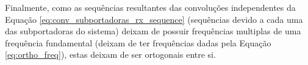 Finalmente, como as sequências resultantes das convoluções independentes da Equação \ref{eq:conv_subportadoras_rx_sequence} (sequências devido a cada uma das subportadoras do sistema) deixam de possuir frequências multiplas de uma frequência fundamental (deixam de ter frequências dadas pela Equação \ref{eq:ortho_freq}), estas deixam de ser ortogonais entre si.




